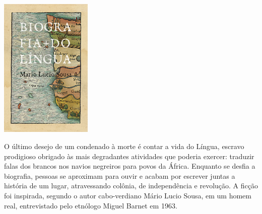 \begin{center}
\hspace*{-4cm}
\hspace*{4cm}\includegraphics[width=44mm]{./imgs/lingua.jpg}
\end{center}

\hspace*{-7cm}\hrulefill\hspace*{-7cm}

\medskip

\noindent{}O último desejo de um condenado à morte é contar a vida do Língua, escravo prodigioso obrigado às mais degradantes atividades que poderia exercer: traduzir falas dos brancos nos navios negreiros para povos da África. Enquanto se desfia a biografia, pessoas se aproximam para ouvir e acabam por escrever juntas a história de um lugar, atravessando colônia, de independência e revolução. A ficção foi inspirada, segundo o autor cabo-verdiano Mário Lucio Sousa, em um homem real, entrevistado pelo etnólogo Miguel Barnet em 1963.

\vfill

\hspace*{-.4cm}\begin{minipage}[c]{1\linewidth}
\small{
{}}
\end{minipage}

